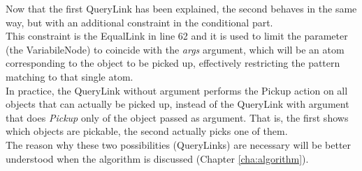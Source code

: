 Now that the first QueryLink has been explained, the second behaves in the same way, but with an additional constraint in the conditional part. \\
This constraint is the EqualLink in line 62 and it is used to limit the parameter (the VariabileNode) to coincide with the \textit{args} argument, which will be an atom corresponding to the object to be picked up, effectively restricting the pattern matching to that single atom. \\
In practice, the QueryLink without argument performs the Pickup action on all objects that can actually be picked up, instead of the QueryLink with argument that does \textit{Pickup} only of the object passed as argument. That is, the first shows which objects are pickable, the second actually picks one of them. \\
The reason why these two possibilities (QueryLinks) are necessary will be better understood when the algorithm is discussed (Chapter \ref{cha:algorithm}). 

 